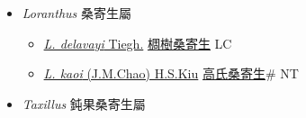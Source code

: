 
  \begin{itemize}
 \item[] \textit{Loranthus} 桑寄生屬
                    
  \begin{itemize}
        \item[] \href{http://www.theplantlist.org/tpl1.1/search?q=Loranthus+delavayi}{\textit{L. delavayi} Tiegh.}   \href{\detokenize{http://taibnet.sinica.edu.tw/chi/taibnet_species_list.php?T2=椆樹桑寄生&T2_new_value=true&fr=y}}{椆樹桑寄生} LC
        \item[] \href{http://www.theplantlist.org/tpl1.1/search?q=Loranthus+kaoi}{\textit{L. kaoi} (J.M.Chao) H.S.Kiu}   \href{\detokenize{http://taibnet.sinica.edu.tw/chi/taibnet_species_list.php?T2=高氏桑寄生&T2_new_value=true&fr=y}}{高氏桑寄生}\# NT
  \end{itemize}
 \item[] \textit{Taxillus} 鈍果桑寄生屬
                    

\end{itemize}
